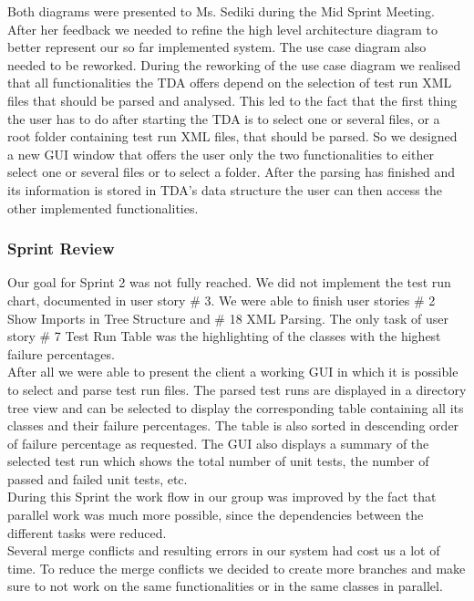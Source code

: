 Both diagrams were presented to Ms. Sediki during the Mid Sprint Meeting. After her feedback we needed to refine the high level architecture diagram to better represent our so far implemented system. The use case diagram also needed to be reworked. During the reworking of the use case diagram we realised that all functionalities the TDA offers depend on the selection of test run XML files that should be parsed and analysed. This led to the fact that the first thing the user has to do after starting the TDA is to select one or several files, or a root folder containing test run XML files, that should be parsed. So we designed a new GUI window that offers the user only the two functionalities to either select one or several files or to select a folder. After the parsing has finished and its information is stored in TDA's data structure the user can then access the other implemented functionalities.

\subsubsection*{Sprint Review}

Our goal for Sprint 2 was not fully reached. We did not implement the test run chart, documented in user story \# 3. We were able to finish user stories \# 2 Show Imports in Tree Structure and \# 18 XML Parsing. The only task of user story \# 7 Test Run Table was the highlighting of the classes with the highest failure percentages. \\ 

After all we were able to present the client a working GUI in which it is possible to select and parse test run files. The parsed test runs are displayed in a directory tree view and can be selected to display the corresponding table containing all its classes and their failure percentages. The table is also sorted in descending order of failure percentage as requested. The GUI also displays a summary of the selected test run which shows the total number of unit tests, the number of passed and failed unit tests, etc. \\ 

During this Sprint the work flow in our group was improved by the fact that parallel work was much more possible, since the dependencies between the different tasks were reduced. \\ 

Several merge conflicts and resulting errors in our system had cost us a lot of time. To reduce the merge conflicts we decided to create more branches and make sure to not work on the same functionalities or in the same classes in parallel. \\ 
